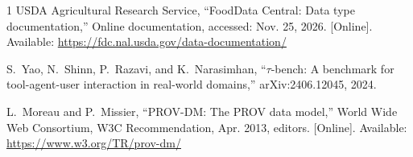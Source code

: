 \documentclass[conference]{IEEEtran}
\begin{document}
\begin{thebibliography}{1}
\BIBentryALTinterwordspacing
{USDA Agricultural Research Service}, ``{FoodData Central}: Data type documentation,'' Online documentation, accessed: Nov. 25, 2026. [Online]. Available: \url{https://fdc.nal.usda.gov/data-documentation/}
\BIBentrySTDinterwordspacing

S.~Yao, N.~Shinn, P.~Razavi, and K.~Narasimhan, ``{\(\tau\)}-bench: A benchmark for tool-agent-user interaction in real-world domains,'' arXiv:2406.12045, 2024.

\BIBentryALTinterwordspacing
L.~Moreau and P.~Missier, ``{PROV-DM}: The {PROV} data model,'' World Wide Web Consortium, W3C Recommendation, Apr. 2013, editors. [Online]. Available: \url{https://www.w3.org/TR/prov-dm/}
\BIBentrySTDinterwordspacing

\end{thebibliography}
\end{document}
